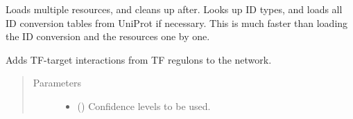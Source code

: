 \documentclass[letterpaper,10pt,english]{sphinxmanual}
\begin{document}
\begin{fulllineitems}

\begin{fulllineitems}
\label{\detokenize{main:pypath.main.PyPath.load_resource}}
\end{fulllineitems}


\begin{fulllineitems}
\label{\detokenize{main:pypath.main.PyPath.load_resources}}
Loads multiple resources, and cleans up after.
Looks up ID types, and loads all ID conversion
tables from UniProt if necessary. This is much
faster than loading the ID conversion and the
resources one by one.

\end{fulllineitems}


\begin{fulllineitems}
\label{\detokenize{main:pypath.main.PyPath.load_signor_ptms}}
\end{fulllineitems}


\begin{fulllineitems}
\label{\detokenize{main:pypath.main.PyPath.load_tfregulons}}
Adds TF-target interactions from TF regulons to the network.
\begin{quote}\begin{description}
\item[{Parameters}] \leavevmode\begin{itemize}
\item {} 
 () \textendash{} Confidence levels to be used.


\end{itemize}
\end{description}
\end{quote}
\end{fulllineitems}
\end{fulllineitems}
\end{document}
